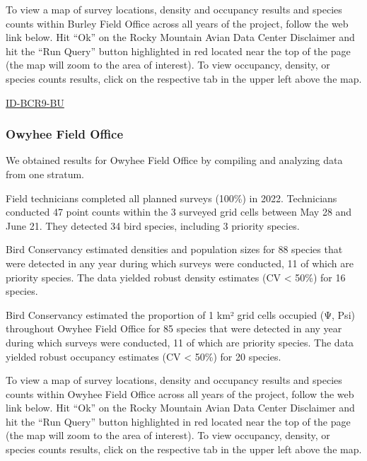 \documentclass[
  letterpaper,
  DIV=11,
  numbers=noendperiod,
  oneside]{scrreprt}
\begin{document}
To view a map of survey locations, density and occupancy results and
species counts within Burley Field Office across all years of the
project, follow the web link below. Hit ``Ok'' on the Rocky Mountain
Avian Data Center Disclaimer and hit the ``Run Query'' button
highlighted in red located near the top of the page (the map will zoom
to the area of interest). To view occupancy, density, or species counts
results, click on the respective tab in the upper left above the map.

\href{http://www.rmbo.org/new_site/adc/QueryWindow.aspx\#N4IgzgLgTghhCuBbEAuABCAkgEQLQCEBhAJQE4CBVdfeKAUxnjQHsAzNAGRgDsATNALI8YAczqI63CGlxoaUADZ0AnmgBiASzoL+AeVasNAYzogAvkA=}{ID-BCR9-BU}

\hypertarget{owyhee-field-office}{%
\subsubsection{Owyhee Field Office}\label{owyhee-field-office}}

We obtained results for Owyhee Field Office by compiling and analyzing
data from one stratum.

Field technicians completed all planned surveys (100\%) in 2022.
Technicians conducted 47 point counts within the 3 surveyed grid cells
between May 28 and June 21. They detected 34 bird species, including 3
priority species.

Bird Conservancy estimated densities and population sizes for 88 species
that were detected in any year during which surveys were conducted, 11
of which are priority species. The data yielded robust density estimates
(CV \textless{} 50\%) for 16 species.

Bird Conservancy estimated the proportion of 1 km² grid cells occupied
(Ψ, Psi) throughout Owyhee Field Office for 85 species that were
detected in any year during which surveys were conducted, 11 of which
are priority species. The data yielded robust occupancy estimates (CV
\textless{} 50\%) for 20 species.

To view a map of survey locations, density and occupancy results and
species counts within Owyhee Field Office across all years of the
project, follow the web link below. Hit ``Ok'' on the Rocky Mountain
Avian Data Center Disclaimer and hit the ``Run Query'' button
highlighted in red located near the top of the page (the map will zoom
to the area of interest). To view occupancy, density, or species counts
results, click on the respective tab in the upper left above the map.
\end{document}
